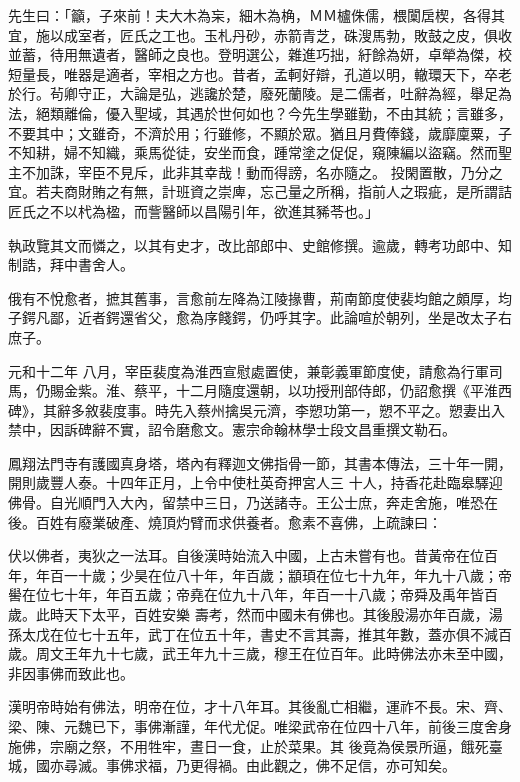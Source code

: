 \begin{pinyinscope}
 先生曰：「籲，子來前！夫大木為杗，細木為桷，ＭＭ櫨侏儒，椳闑扂楔，各得其宜，施以成室者，匠氏之工也。玉札丹砂，赤箭青芝，硃溲馬勃，敗鼓之皮，俱收並蓄，待用無遺者，醫師之良也。登明選公，雜進巧拙，紆餘為妍，卓犖為傑，校
 短量長，唯器是適者，宰相之方也。昔者，孟軻好辯，孔道以明，轍環天下，卒老於行。茍卿守正，大論是弘，逃讒於楚，廢死蘭陵。是二儒者，吐辭為經，舉足為法，絕類離倫，優入聖域，其遇於世何如也？今先生學雖勤，不由其統；言雖多，不要其中；文雖奇，不濟於用；行雖修，不顯於眾。猶且月費俸錢，歲靡廩粟，子不知耕，婦不知織，乘馬從徒，安坐而食，踵常塗之促促，窺陳編以盜竊。然而聖主不加誅，宰臣不見斥，此非其幸哉！動而得謗，名亦隨之。
 投閑置散，乃分之宜。若夫商財賄之有無，計班資之崇庳，忘己量之所稱，指前人之瑕疵，是所謂詰匠氏之不以杙為楹，而訾醫師以昌陽引年，欲進其豨苓也。」



 執政覽其文而憐之，以其有史才，改比部郎中、史館修撰。逾歲，轉考功郎中、知制誥，拜中書舍人。



 俄有不悅愈者，摭其舊事，言愈前左降為江陵掾曹，荊南節度使裴均館之頗厚，均子鍔凡鄙，近者鍔還省父，愈為序餞鍔，仍呼其字。此論喧於朝列，坐是改太子右庶子。



 元和十二年
 八月，宰臣裴度為淮西宣慰處置使，兼彰義軍節度使，請愈為行軍司馬，仍賜金紫。淮、蔡平，十二月隨度還朝，以功授刑部侍郎，仍詔愈撰《平淮西碑》，其辭多敘裴度事。時先入蔡州擒吳元濟，李愬功第一，愬不平之。愬妻出入禁中，因訴碑辭不實，詔令磨愈文。憲宗命翰林學士段文昌重撰文勒石。



 鳳翔法門寺有護國真身塔，塔內有釋迦文佛指骨一節，其書本傳法，三十年一開，開則歲豐人泰。十四年正月，上令中使杜英奇押宮人三
 十人，持香花赴臨皋驛迎佛骨。自光順門入大內，留禁中三日，乃送諸寺。王公士庶，奔走舍施，唯恐在後。百姓有廢業破產、燒頂灼臂而求供養者。愈素不喜佛，上疏諫曰：



 伏以佛者，夷狄之一法耳。自後漢時始流入中國，上古未嘗有也。昔黃帝在位百年，年百一十歲；少昊在位八十年，年百歲；顓頊在位七十九年，年九十八歲；帝嚳在位七十年，年百五歲；帝堯在位九十八年，年百一十八歲；帝舜及禹年皆百歲。此時天下太平，百姓安樂
 壽考，然而中國未有佛也。其後殷湯亦年百歲，湯孫太戊在位七十五年，武丁在位五十年，書史不言其壽，推其年數，蓋亦俱不減百歲。周文王年九十七歲，武王年九十三歲，穆王在位百年。此時佛法亦未至中國，非因事佛而致此也。



 漢明帝時始有佛法，明帝在位，才十八年耳。其後亂亡相繼，運祚不長。宋、齊、梁、陳、元魏已下，事佛漸謹，年代尤促。唯梁武帝在位四十八年，前後三度舍身施佛，宗廟之祭，不用牲牢，晝日一食，止於菜果。其
 後竟為侯景所逼，餓死臺城，國亦尋滅。事佛求福，乃更得禍。由此觀之，佛不足信，亦可知矣。




\end{pinyinscope}
